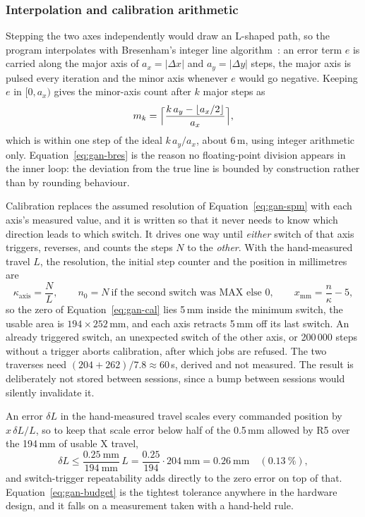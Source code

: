 \subsubsection{Interpolation and calibration arithmetic}

Stepping the two axes independently would draw an L-shaped path, so the program interpolates with Bresenham's integer line algorithm~\cite{bresenham1965}: an error term $e$ is carried along the major axis of $a_x=|\Delta x|$ and $a_y=|\Delta y|$ steps, the major axis is pulsed every iteration and the minor axis whenever $e$ would go negative.
Keeping $e$ in $[0,a_x)$ gives the minor-axis count after $k$ major steps as
\begin{equation}
m_k=\Bigl\lceil\frac{k\,a_y-\lfloor a_x/2\rfloor}{a_x}\Bigr\rceil,
\label{eq:gan-bres}
\end{equation}
which is within one step of the ideal $k\,a_y/a_x$, about 6\,\textmu m, using integer arithmetic only.
Equation~\ref{eq:gan-bres} is the reason no floating-point division appears in the inner loop: the deviation from the true line is bounded by construction rather than by rounding behaviour.

Calibration replaces the assumed resolution of Equation~\ref{eq:gan-spm} with each axis's measured value, and it is written so that it never needs to know which direction leads to which switch.
It drives one way until \emph{either} switch of that axis triggers, reverses, and counts the steps $N$ to the \emph{other}.
With the hand-measured travel $L$, the resolution, the initial step counter and the position in millimetres are
\begin{equation}
\kappa_{\mathrm{axis}}=\frac{N}{L},\qquad n_0=N\ \text{if the second switch was MAX else }0,\qquad x_{\mathrm{mm}}=\frac{n}{\kappa}-5,
\label{eq:gan-cal}
\end{equation}
so the zero of Equation~\ref{eq:gan-cal} lies 5\,mm inside the minimum switch, the usable area is $194\times252$\,mm, and each axis retracts 5\,mm off its last switch.
An already triggered switch, an unexpected switch of the other axis, or 200\,000 steps without a trigger aborts calibration, after which jobs are refused.
The two traverses need $(204+262)/7.8\approx60$\,s, derived and not measured.
The result is deliberately not stored between sessions, since a bump between sessions would silently invalidate it.

An error $\delta L$ in the hand-measured travel scales every commanded position by $x\,\delta L/L$, so to keep that scale error below half of the 0.5\,mm allowed by R5 over the 194\,mm of usable X travel,
\begin{equation}
\delta L\le\frac{0.25\ \mathrm{mm}}{194\ \mathrm{mm}}\,L=\frac{0.25}{194}\cdot204\ \mathrm{mm}=0.26\ \mathrm{mm}\quad(0.13\ \%),
\label{eq:gan-budget}
\end{equation}
and switch-trigger repeatability adds directly to the zero error on top of that.
Equation~\ref{eq:gan-budget} is the tightest tolerance anywhere in the hardware design, and it falls on a measurement taken with a hand-held rule.

